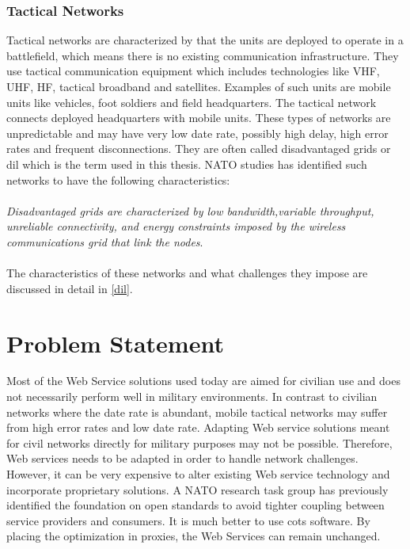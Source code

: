 \documentclass[USenglish]{ifimaster}
\begin{document}
\subsubsection{Tactical Networks}
Tactical networks are characterized by that the units are deployed to operate in
a battlefield, which means there is no existing communication infrastructure.
They use tactical communication equipment which includes technologies like VHF,
UHF, HF, tactical broadband and satellites\cite{IST-090}. %
Examples of such units are mobile units like vehicles, foot soldiers and field
headquarters. The tactical network connects deployed headquarters with mobile
units. These types of networks are unpredictable and may have very low date
rate, possibly high delay, high error rates and frequent disconnections. They
are often called disadvantaged grids or \gls{dil} which is the term used in this
thesis. NATO studies has identified such networks to have the following
characteristics:
\\\\
\textit{
Disadvantaged grids are characterized by low bandwidth,variable throughput,
unreliable connectivity, and energy constraints imposed by the wireless
communications grid that link the nodes}\cite{nato-disadvantaged-grids}.
\paragraph{}
The characteristics of these networks and what challenges they impose are
discussed in detail in \cref{dil}.

\section{Problem Statement}
Most of the Web Service solutions used today are aimed for civilian use and does
not necessarily perform well in military environments. In contrast to civilian
networks where the date rate is abundant, mobile tactical networks may suffer
from high error rates and low date rate. Adapting Web service solutions meant
for civil networks directly for military purposes may not be possible.
Therefore, Web services needs to be adapted in order to handle network
challenges. However, it can be very expensive to alter existing Web service
technology and incorporate proprietary solutions. A NATO research task group has
previously identified the foundation on open standards to avoid tighter coupling
between service providers and consumers\cite{IST-090}. It is much better to use
\gls{cots} software. By placing the optimization in proxies, the
Web Services can remain unchanged.
\end{document}
